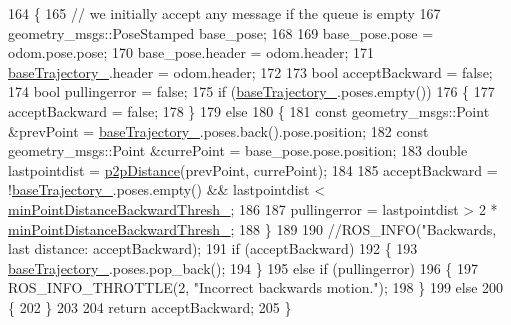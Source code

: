 \begin{DoxyCode}
164 \{
165     \textcolor{comment}{// we initially accept any message if the queue is empty}
167 \textcolor{comment}{}    geometry\_msgs::PoseStamped base\_pose;
168 
169     base\_pose.pose = odom.pose.pose;
170     base\_pose.header = odom.header;
171     \hyperlink{classcl__move__base__z_1_1odom__tracker_1_1OdomTracker_a466d18a86df049f0f680e043bb5ea91f}{baseTrajectory\_}.header = odom.header;
172 
173     \textcolor{keywordtype}{bool} acceptBackward = \textcolor{keyword}{false};
174     \textcolor{keywordtype}{bool} pullingerror = \textcolor{keyword}{false};
175     \textcolor{keywordflow}{if} (\hyperlink{classcl__move__base__z_1_1odom__tracker_1_1OdomTracker_a466d18a86df049f0f680e043bb5ea91f}{baseTrajectory\_}.poses.empty())
176     \{
177         acceptBackward = \textcolor{keyword}{false};
178     \}
179     \textcolor{keywordflow}{else}
180     \{
181         \textcolor{keyword}{const} geometry\_msgs::Point &prevPoint = \hyperlink{classcl__move__base__z_1_1odom__tracker_1_1OdomTracker_a466d18a86df049f0f680e043bb5ea91f}{baseTrajectory\_}.poses.back().pose.position;
182         \textcolor{keyword}{const} geometry\_msgs::Point &currePoint = base\_pose.pose.position;
183         \textcolor{keywordtype}{double} lastpointdist = \hyperlink{namespacecl__move__base__z_1_1odom__tracker_a501582a760a02ce0069d95bfc67ca973}{p2pDistance}(prevPoint, currePoint);
184 
185         acceptBackward = !\hyperlink{classcl__move__base__z_1_1odom__tracker_1_1OdomTracker_a466d18a86df049f0f680e043bb5ea91f}{baseTrajectory\_}.poses.empty() && lastpointdist < 
      \hyperlink{classcl__move__base__z_1_1odom__tracker_1_1OdomTracker_ac1c711aabcc005981c256f8f45c0555b}{minPointDistanceBackwardThresh\_};
186 
187         pullingerror = lastpointdist > 2 * \hyperlink{classcl__move__base__z_1_1odom__tracker_1_1OdomTracker_ac1c711aabcc005981c256f8f45c0555b}{minPointDistanceBackwardThresh\_};
188     \}
189 
190     \textcolor{comment}{//ROS\_INFO("Backwards, last distance: %
       acceptBackward);}
191     \textcolor{keywordflow}{if} (acceptBackward)
192     \{
193         \hyperlink{classcl__move__base__z_1_1odom__tracker_1_1OdomTracker_a466d18a86df049f0f680e043bb5ea91f}{baseTrajectory\_}.poses.pop\_back();
194     \}
195     \textcolor{keywordflow}{else} \textcolor{keywordflow}{if} (pullingerror)
196     \{
197         ROS\_INFO\_THROTTLE(2, \textcolor{stringliteral}{"Incorrect backwards motion."});
198     \}
199     \textcolor{keywordflow}{else}
200     \{
202     \}
203 
204     \textcolor{keywordflow}{return} acceptBackward;
205 \}
\end{DoxyCode}



